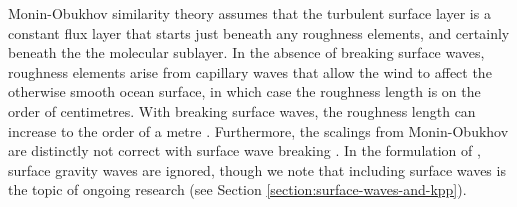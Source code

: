 Monin-Obukhov similarity theory assumes that the turbulent surface
layer is a constant flux layer that starts just beneath any roughness
elements, and certainly beneath the the molecular sublayer.  In the
absence of breaking surface waves, roughness elements arise from
capillary waves that allow the wind to affect the otherwise smooth
ocean surface, in which case the roughness length is on the order of
centimetres.  With breaking surface waves, the roughness length can
increase to the order of a metre \citep[e.g., see concluding section
to][]{Craig_Banner_1994}.  Furthermore, the scalings from
Monin-Obukhov are distinctly not correct with surface wave breaking
\citep[e.g.,][]{Craig_Banner_1994,Terray_etal1996}.  In the
formulation of \cite{LargeKPP}, surface gravity waves are ignored,
though we note that including surface waves is the topic of ongoing
research (see Section \ref{section:surface-waves-and-kpp}).

